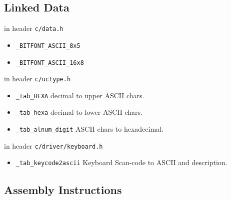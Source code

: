 \subsection{Linked Data}

in header \verb|c/data.h|

\begin{itemize}

\item \verb|_BITFONT_ASCII_8x5|
\item \verb|_BITFONT_ASCII_16x8|
\end{itemize}

in header \verb|c/uctype.h|

\begin{itemize}

\item \verb|_tab_HEXA| decimal to upper ASCII chars.
\item \verb|_tab_hexa| decimal to lower ASCII chars.
\item \verb|_tab_alnum_digit| ASCII chars to hexadecimal.
\end{itemize}

in header \verb|c/driver/keyboard.h|

\begin{itemize}

\item \verb|_tab_keycode2ascii| Keyboard Scan-code to ASCII and description.
\end{itemize}



\subsection{Assembly Instructions}

